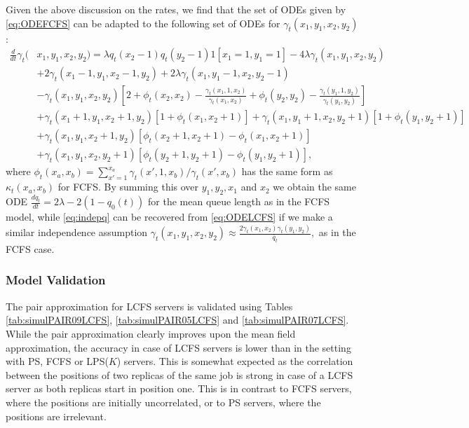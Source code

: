 \documentclass[acmsmall,nonacm]{acmart}
\begin{document}
Given the above discussion on the rates, we find that the set of ODEs given by \eqref{eq:ODEFCFS}
can be adapted to the following set of ODEs for $\gamma_t(x_1,y_1,x_2,y_2)$:
\begin{align}\label{eq:ODELCFS}
    \frac{d}{dt} \gamma_t(&x_1,y_1,x_2,y_2)= \lambda q_t(x_2-1) q_t(y_2-1) 
    1[x_1=1, y_1=1]- 4\lambda \gamma_t(x_1,y_1,x_2,y_2) \nonumber \\&+
    2\gamma_t(x_1-1,y_1,x_2-1,y_2) + 2\lambda \gamma_t(x_1,y_1-1,x_2,y_2-1) \nonumber\\
    &-\gamma_t(x_1,y_1,x_2,y_2) 
    \left[2+ \phi_t(x_2,x_2) - \frac{\gamma_t(x_1,1,x_2)}{\gamma_t(x_1,x_2)}
    + \phi_t(y_2,y_2) - \frac{\gamma_t(y_1,1,y_2)}{\gamma_t(y_1,y_2)}\right] 
    \nonumber \\ 
    &+\gamma_t(x_1+1,y_1,x_2+1,y_2) 
    \left[1+ \phi_t(x_1,x_2+1) \right] +\gamma_t(x_1,y_1+1,x_2,y_2+1) 
    \left[1+ \phi_t(y_1,y_2+1) \right]\nonumber \\
    &+\gamma_t(x_1,y_1,x_2+1,y_2) 
    \left[\phi_t(x_2+1,x_2+1) -\phi_t(x_1,x_2+1) \right] \nonumber \\
    &+\gamma_t(x_1,y_1,x_2,y_2+1) 
    \left[\phi_t(y_2+1,y_2+1) -\phi_t(y_1,y_2+1) \right],
\end{align}
where $\phi_t(x_a,x_b)=\sum_{x'=1}^{x_a} \gamma_t(x',1,x_b)/\gamma_t(x',x_b)$ has the same
form as $\kappa_t(x_a,x_b)$ for FCFS.
By summing this over $y_1,y_2,x_1$ and $x_2$ we obtain the same 
ODE  $\frac{d q_t}{dt} = 2\lambda - 2(1-q_0(t))$ for the mean queue length as in the FCFS model,
while \eqref{eq:indepq} can be recovered from \eqref{eq:ODELCFS} if we make a similar
independence assumption $\gamma_t(x_1,y_1,x_2,y_2)\approx \frac{2\gamma_t(x_1,x_2)\gamma_t(y_1,y_2)}{\bar q_t},$ as in the FCFS case.


\subsubsection{Model Validation}

The pair approximation for LCFS servers is validated using 
Tables \ref{tab:simulPAIR09LCFS}, \ref{tab:simulPAIR05LCFS} and \ref{tab:simulPAIR07LCFS}.
While the pair approximation clearly improves upon the mean field approximation, the
accuracy in case of LCFS servers is lower than in the setting with PS, FCFS or LPS($K$) servers.
This is somewhat expected as the correlation between the positions of two replicas of the same job is
strong in case of a LCFS server as both replicas start in position one. This is in contrast
to FCFS servers, where the positions are initially uncorrelated, or to PS servers, where the positions
are irrelevant.
\end{document}
